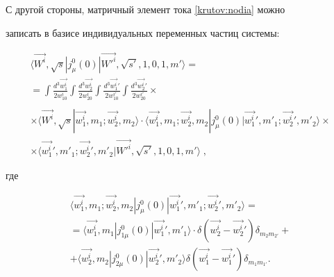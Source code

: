 С другой стороны, матричный элемент тока \eqref{krutov:nodia} можно

записать в базисе индивидуальных переменных частиц системы:



\begin{multline}\label{krutov:Clebsh}

\langle\vec{W^i},\sqrt{s}|j^{0}_\mu(0)|\vec{W'^{i}},\sqrt{s'}, 1, 0, 1, m'\rangle =

\\

=\int\frac{d^3{\vec{w^i_1}}}{2w^i_{10}}\int\frac{d^3{\vec{w^i_2}}}{2w^i_{20}}\int\frac{d^3{\vec{w^{i}_1}'}}{2w^{i'}_{10}}\int

\frac{d^3{\vec{w^{i}_2}'}}{2w^{i'}_{20}}

\times \\

\\

\times

\langle\vec{W^i},\sqrt{s}|\vec{w^{i}_1},m_{1};\vec{w^{i}_2},m_{2}\rangle\cdot

\langle\vec{w^{i}_1},m_{1};\vec{w^{i}_2},m_{2}|j^{0}_\mu(0)|\vec{w^{i}_1}',m'_{1};\vec{w^{i}_2}',m'_{2}\rangle

\times

\\

\times 

\langle\vec{w^{i}_1}',m'_{1};\vec{w^{i}_2}',m'_{2}|\vec{W'^{i}},\sqrt{s'}, 1, 0, 1, m'\rangle\;,

\end{multline}

где

\begin{multline}\label{krutov:n1}

\langle\vec{w^i_1},m_{1};\vec{w^i_2},m_{2}|j^{0}_\mu(0)|\vec{w^i_1}',m'_{1};\vec{w^i_2}',m'_{2}\rangle

=\\

= \langle\vec{w^i_1},m_{1}|j^{0}_{1\mu }(0)|\vec{w^i_1}',m'_{1}\rangle \cdot 

\delta(\vec{w^i_2}-\vec{w^i_2}')\delta_{m_{2} m_{2'}} + \\

+

\langle\vec{w^i_2},m_{2}|j^{0}_{2\mu }(0)|\vec{w^i_2}',m'_{2}\rangle

\delta(\vec{w^i_1}-\vec{w^i_1}') \delta_{m_{1} m_{1'}}.

\end{multline}



